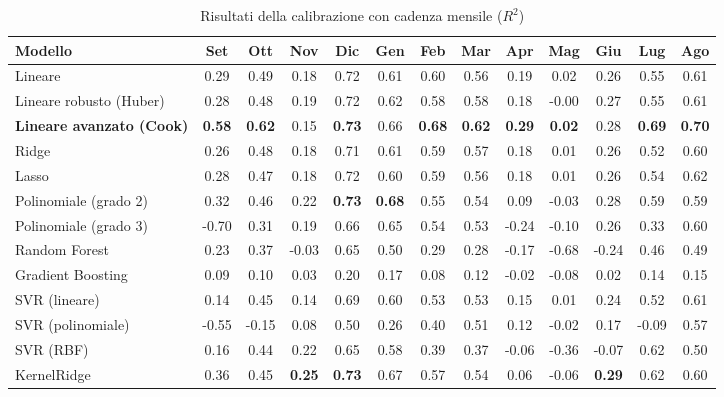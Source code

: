 \begin{table}[H]
    \tiny
    \centering
    \setlength{\tabcolsep}{4pt}
    \def\arraystretch{1.5}
    \begin{tabular}{|l|c|c|c|c|c|c|c|c|c|c|c|c|}
    \hline
        \textbf{Modello} & \textbf{Set} & \textbf{Ott} & \textbf{Nov} & \textbf{Dic} & \textbf{Gen} & \textbf{Feb} & \textbf{Mar} & \textbf{Apr} & \textbf{Mag} & \textbf{Giu} & \textbf{Lug} & \textbf{Ago} \\ \hline
        Lineare & 0.29 & 0.49 & 0.18 & 0.72 & 0.61 & 0.60 & 0.56 & 0.19 & 0.02 & 0.26 & 0.55 & 0.61 \\ \hline
        Lineare robusto (Huber) & 0.28 & 0.48 & 0.19 & 0.72 & 0.62 & 0.58 & 0.58 & 0.18 & -0.00 & 0.27 & 0.55 & 0.61 \\ \hline
        \textbf{Lineare avanzato (Cook)} & \textbf{0.58} & \textbf{0.62} & 0.15 & \textbf{0.73} & 0.66 & \textbf{0.68} & \textbf{0.62} & \textbf{0.29} & \textbf{0.02} & 0.28 & \textbf{0.69} & \textbf{0.70} \\ \hline
        Ridge & 0.26 & 0.48 & 0.18 & 0.71 & 0.61 & 0.59 & 0.57 & 0.18 & 0.01 & 0.26 & 0.52 & 0.60 \\ \hline
        Lasso & 0.28 & 0.47 & 0.18 & 0.72 & 0.60 & 0.59 & 0.56 & 0.18 & 0.01 & 0.26 & 0.54 & 0.62 \\ \hline
        Polinomiale (grado 2) & 0.32 & 0.46 & 0.22 & \textbf{0.73} & \textbf{0.68} & 0.55 & 0.54 & 0.09 & -0.03 & 0.28 & 0.59 & 0.59 \\ \hline
        Polinomiale (grado 3) & -0.70 & 0.31 & 0.19 & 0.66 & 0.65 & 0.54 & 0.53 & -0.24 & -0.10 & 0.26 & 0.33 & 0.60 \\ \hline
        Random Forest & 0.23 & 0.37 & -0.03 & 0.65 & 0.50 & 0.29 & 0.28 & -0.17 & -0.68 & -0.24 & 0.46 & 0.49 \\ \hline
        Gradient Boosting & 0.09 & 0.10 & 0.03 & 0.20 & 0.17 & 0.08 & 0.12 & -0.02 & -0.08 & 0.02 & 0.14 & 0.15 \\ \hline
        SVR (lineare) & 0.14 & 0.45 & 0.14 & 0.69 & 0.60 & 0.53 & 0.53 & 0.15 & 0.01 & 0.24 & 0.52 & 0.61 \\ \hline
        SVR (polinomiale) & -0.55 & -0.15 & 0.08 & 0.50 & 0.26 & 0.40 & 0.51 & 0.12 & -0.02 & 0.17 & -0.09 & 0.57 \\ \hline
        SVR (RBF) & 0.16 & 0.44 & 0.22 & 0.65 & 0.58 & 0.39 & 0.37 & -0.06 & -0.36 & -0.07 & 0.62 & 0.50 \\ \hline
        KernelRidge & 0.36 & 0.45 & \textbf{0.25} & \textbf{0.73} & 0.67 & 0.57 & 0.54 & 0.06 & -0.06 & \textbf{0.29} & 0.62 & 0.60 \\ \hline
    \end{tabular}
    \captionsetup{justification=centering}
    \caption{Risultati della calibrazione  con cadenza mensile ($R^2$)}
    \label{fig:risultati-pm2.5-mese}
\end{table}

